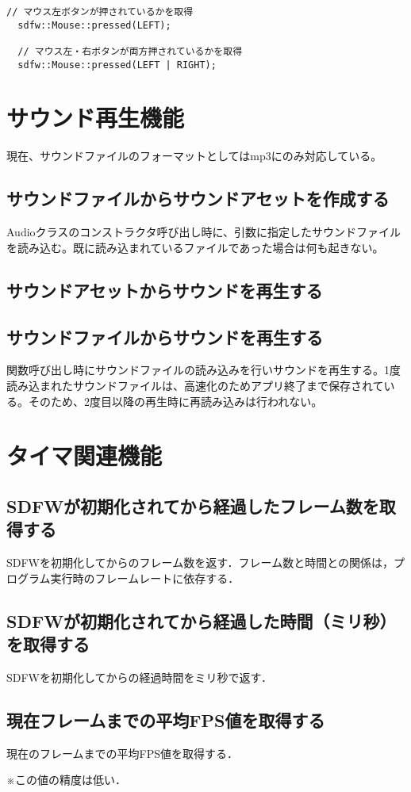 \documentclass[a4paper, 11pt, oneside, onecolumn, openany]{jsarticle}
\begin{document}
\begin{lstlisting}[caption=使用例, label=macro-GetMouseButtonState, keepspaces=true]
  // マウス左ボタンが押されているかを取得
  sdfw::Mouse::pressed(LEFT);

  // マウス左・右ボタンが両方押されているかを取得
  sdfw::Mouse::pressed(LEFT | RIGHT);
\end{lstlisting}


\section{サウンド再生機能}
現在、サウンドファイルのフォーマットとしてはmp3にのみ対応している。
\subsection{サウンドファイルからサウンドアセットを作成する}
Audioクラスのコンストラクタ呼び出し時に、引数に指定したサウンドファイルを読み込む。既に読み込まれているファイルであった場合は何も起きない。

\subsection{サウンドアセットからサウンドを再生する}

\subsection{サウンドファイルからサウンドを再生する}
関数呼び出し時にサウンドファイルの読み込みを行いサウンドを再生する。1度読み込まれたサウンドファイルは、高速化のためアプリ終了まで保存されている。そのため、2度目以降の再生時に再読み込みは行われない。


\section{タイマ関連機能}
\subsection{SDFWが初期化されてから経過したフレーム数を取得する}
SDFWを初期化してからのフレーム数を返す．フレーム数と時間との関係は，プログラム実行時のフレームレートに依存する．

\subsection{SDFWが初期化されてから経過した時間（ミリ秒）を取得する}
SDFWを初期化してからの経過時間をミリ秒で返す．

\subsection{現在フレームまでの平均FPS値を取得する}
現在のフレームまでの平均FPS値を取得する．\par
※この値の精度は低い．
\end{document}
